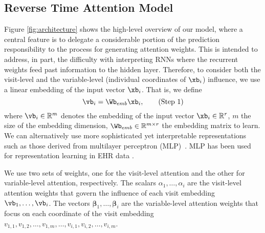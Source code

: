 \subsection{Reverse Time Attention Model \alg}
\label{ssec:model}
Figure \ref{fig:architecture} shows the high-level overview of our model, where a central feature is to delegate a considerable portion of the prediction responsibility to the process for generating attention weights. This is intended to address, in part, the difficulty with interpreting RNNs where the recurrent weights feed past information to the hidden layer. Therefore, to consider both the visit-level and the variable-level (individual coordinates of $\xb_i$) influence, we use a linear embedding of the input vector $\xb_i$.  That is, we define
\begin{equation}
\vb_i = \Wb_{emb} \xb_i,  \tag{Step 1}
\end{equation}
\noindent where $\vb_i \in \mathbb{R}^{m}$ denotes the embedding of the input vector $\xb_i \in \mathbb{R}^{r}$, $m$ the size of the embedding dimension, $\Wb_{emb} \in \mathbb{R}^{m \times r}$ the embedding matrix to learn. We can alternatively use more sophisticated yet interpretable representations such as those derived from multilayer perceptron (MLP)~\cite{erhan2009visualizing,le2013building}. MLP has been used for representation learning in EHR data \cite{choi2016multi}.


We use two sets of weights, one for the visit-level attention and the other for variable-level attention, respectively. The scalars $\alpha_1, \ldots, \alpha_i$ are the visit-level attention weights that govern the influence of each visit embedding $\vb_1, \ldots, \vb_i$. The vectors $\bm{\beta}_1, \ldots, \bm{\beta}_i$ are the variable-level attention weights that focus on each coordinate of the visit embedding $v_{1,1}, v_{1,2}, \ldots, v_{1,m}, \ldots, v_{i,1}, v_{i,2}, \ldots, v_{i,m}$. 

